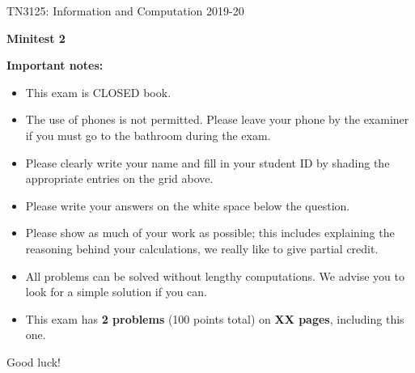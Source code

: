 \documentclass[11pt,a4paper,twoside]{article}
\begin{document}
\vspace*{-3cm}
TN3125: Information and Computation 2019-20 \\

\vspace{8cm}

\noindent \begin{center}
\textbf{{\Large Minitest 2}}\\
\par\end{center}

\vspace*{1cm}

\noindent \textbf{Important notes:}

\begin{itemize}
\item This exam is CLOSED book.
\item The use of phones is not permitted. Please leave your phone by the examiner if you must go to the bathroom during the exam.
\item Please clearly write your name and fill in your student ID by shading the appropriate entries on the grid above.
\item Please write your answers on the white space below the question. 
\item Please show as much of your work as possible; this includes explaining the reasoning behind your calculations, we really like to give partial credit.
\item All problems can be solved without lengthy computations. We advise you to look for a simple solution if you can.
\item This exam has {\bf 2 problems} (100 points total) on {\bf XX pages}, including this one.
\end{itemize}
\vspace{2cm}
Good luck!
\end{document}

